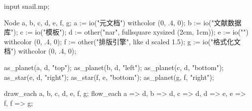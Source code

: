 \usemodule[zhfonts]
  
\startMPpage
input snail.mp;

Node a, b, c, d, e, f, g;
a := io("元文档") withcolor (0, .4, 0);
b := io("文献数据库");
c := io("模板");
d := other("nar", fullsquare xysized (2cm, 1cm));
e := io("") withcolor (0, .4, 0);
f := other("排版引擎", like d scaled 1.5);
g := io("格式化文档") withcolor (0, .4, 0);

as_planet(a, d, "top"); as_planet(b, d, "left"); as_planet(c, d, "bottom");
as_star(e, d, "right"); as_star(f, e, "bottom"); as_planet(g, f, "right");

draw_each a, b, c, d, e, f, g;
flow_each a => d, b => d, c => d, d => e, e => f, f => g;
\stopMPpage
